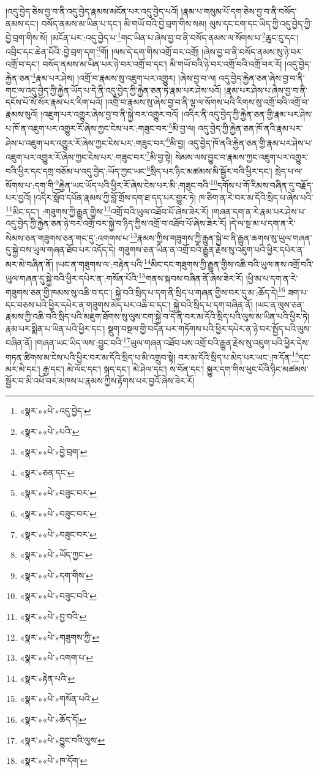 །འདུ་བྱེད་ཅེས་བྱ་བ་ནི་འདུ་བྱེད་རྣམས་མངོན་པར་འདུ་བྱེད་པའོ། །རྣམ་པ་གསུམ་པོ་དག་ཅེས་བྱ་བ་ནི་བསོད་ནམས་དང་། བསོད་ནམས་མ་ཡིན་པ་དང་། མི་གཡོ་བའི་བྱེ་བྲག་གིས་སམ། ལུས་དང་ངག་དང་ཡིད་ཀྱི་འདུ་བྱེད་ཀྱི་བྱེ་བྲག་གིས་སོ། །མངོན་པར་:འདུ་བྱེད་པ་\footnote{«སྣར་»«པེ་»འདུ་བྱེད་}གང་ཡིན་པ་ཞེས་བྱ་བ་ནི་བསོད་ནམས་ལ་སོགས་པ་\footnote{«སྣར་»«པེ་»པའི་}ཆུང་ངུ་དང་། འབྲིང་དང་ཆེན་པོའི་:བྱེ་བྲག་དག་\footnote{«སྣར་»«པེ་»བྱེ་བྲག་}གོ། །ལས་དེ་དག་གིས་འགྲོ་བར་འགྲོ། །ཞེས་བྱ་བ་ནི་བསོད་ནམས་སུ་ཉེ་བར་འགྲོ་བ་དང་། བསོད་ནམས་མ་ཡིན་པར་ཉེ་བར་འགྲོ་བ་དང་། མི་གཡོ་བའི་ཉེ་བར་འགྲོ་བའི་འགྲོ་བར་རོ། །འདུ་བྱེད་རྐྱེན་ཅན་\footnote{«སྣར་»ཅན་དང་}རྣམ་པར་ཤེས། །འགྲོ་བ་རྣམས་སུ་འཇུག་པར་འགྱུར། །ཞེས་བྱ་བ་ལ། འདུ་བྱེད་རྐྱེན་ཅན་ཞེས་བྱ་བ་ནི་གང་ལ་འདུ་བྱེད་ཀྱི་རྐྱེན་ཡོད་པ་དེ་ནི་འདུ་བྱེད་ཀྱི་རྐྱེན་ཅན་ཏེ་རྣམ་པར་ཤེས་པའོ། །རྣམ་པར་ཤེས་པ་ཞེས་བྱ་བ་ནི་དངོས་པོ་སོ་སོར་རྣམ་པར་རིག་པའོ། །འགྲོ་བ་རྣམས་སུ་ཞེས་བྱ་བ་ནི་ལྷ་ལ་སོགས་པའི་རིགས་སུ་འགྲོ་བའི་འགྲོ་བ་རྣམས་སུའོ། །འཇུག་པར་འགྱུར་ཞེས་བྱ་བ་ནི་སྐྱེ་བར་འགྱུར་བའོ། །འདིར་ནི་འདུ་བྱེད་ཀྱི་རྐྱེན་ཅན་གྱི་རྣམ་པར་ཤེས་པ་ཁོ་ན་འཇུག་པར་འགྱུར་རོ་ཞེས་ཀྱང་ངེས་པར་:གཟུང་བར་\footnote{«སྣར་»«པེ་»བཟུང་བར་}མི་བྱ་ལ། འདུ་བྱེད་ཀྱི་རྐྱེན་ཅན་ཁོ་ནའི་རྣམ་པར་ཤེས་པ་འཇུག་པར་འགྱུར་རོ་ཞེས་ཀྱང་ངེས་པར་:གཟུང་བར་\footnote{«སྣར་»«པེ་»བཟུང་བར་}མི་བྱ། འདུ་བྱེད་ཁོ་ནའི་རྐྱེན་ཅན་གྱི་རྣམ་པར་ཤེས་པ་འཇུག་པར་འགྱུར་རོ་ཞེས་ཀྱང་ངེས་པར་:གཟུང་བར་\footnote{«སྣར་»«པེ་»བཟུང་བར་}མི་བྱ་སྟེ། སེམས་ལས་བྱུང་བ་རྣམས་ཀྱང་འཇུག་པར་འགྱུར་བའི་ཕྱིར་དང་དགྲ་བཅོམ་པ་འདུ་བྱེད་:ཡོད་ཀྱང་ཡང་\footnote{«སྣར་»«པེ་»ཡོད་ཀྱང་}སྲིད་པར་ཉིང་མཚམས་མི་སྦྱོར་བའི་ཕྱིར་དང་། སྲེད་པ་ལ་སོགས་པ་:དག་གི་\footnote{«སྣར་»«པེ་»དག་གིས་}རྐྱེན་ཡང་ཡོད་པའི་ཕྱིར་རོ་ཞེས་ངེས་པར་མི་:གཟུང་བའི་\footnote{«སྣར་»«པེ་»བཟུང་བའི་}དགོས་པ་གོ་རིམས་བཞིན་དུ་བརྗོད་པར་བྱའོ། །འདིར་སློབ་དཔོན་རྣམས་ཀྱི་བློ་གྲོས་དག་ཐ་དད་པར་གྱུར་ཏེ། ཁ་ཅིག་ན་རེ་བར་མ་དོའི་སྲིད་པ་ཞེས་པའི་\footnote{«སྣར་»«པེ་»བྱ་བའི་}མིང་དང་། :གཟུགས་ཀྱི་རྒྱུན་གྱིས་\footnote{«སྣར་»«པེ་»གཟུགས་ཀྱི་}འགྲོ་བའི་ཡུལ་འཐོབ་པོ་ཞེས་ཟེར་རོ། །གཞན་དག་ན་རེ་རྣམ་པར་ཤེས་པ་འདུ་བྱེད་ཀྱི་རྐྱེན་ཅན་ཉེ་བར་འགྲོ་བར་སྐྱེ་བ་ཉིད་ཀྱིས་འགྲོ་བ་འཐོབ་པོ་ཞེས་ཟེར་རོ། །དེ་ལ་སྔ་མ་པ་དག་ན་རེ་སེམས་ཅན་གཟུགས་ཅན་གང་དུ་:འགགས་པ་\footnote{«སྣར་»«པེ་»འགག་པ་}རྣམས་ཀྱིས་གཟུགས་ཀྱི་རྒྱུན་སྐྱེ་བ་ནི་རྒྱུན་ཆགས་སུ་ཡུལ་གཞན་དུ་སྐྱེ་བས་ཡུལ་གཞན་ཐོབ་པར་འདོད་དེ། གཟུགས་ཅན་ཡིན་ན་འགྲོ་བའི་རྒྱུན་རྗེས་སུ་འཇུག་པའི་ཕྱིར་དཔེར་ན་མར་མེ་བཞིན་ནོ། །ཡང་ན་གཟུགས་ལ་:བརྟེན་པའི་\footnote{«སྣར་»རྟེན་པའི་}མིང་དང་གཟུགས་ཀྱི་རྒྱུན་གྱིས་འཆི་བའི་ཡུལ་ནས་འགྲོ་བའི་ཡུལ་གཞན་དུ་སྐྱེ་བའི་ཕྱིར་དཔེར་ན་:གསོན་པོའི་\footnote{«སྣར་»«པེ་»གསོན་པའི་}གནས་སྐབས་བཞིན་ནོ་ཞེས་ཟེར་རོ། །ཕྱི་མ་པ་དག་ན་རེ་གཟུགས་ཅན་གྱི་ཁམས་སུ་འཆི་བ་དང་། སྐྱེ་བའི་སྲིད་པ་དག་ནི་སྲིད་པ་གཞན་གྱིས་བར་དུ་མ་:ཆོད་དེ།\footnote{«སྣར་»«པེ་»ཆོད་དོ།} ཟག་པ་དང་བཅས་པའི་ཕྱིར་དཔེར་ན་གཟུགས་མེད་པར་འཆི་བ་དང་། སྐྱེ་བའི་སྲིད་པ་དག་བཞིན་ནོ། །ཡང་ན་ལུས་ཅན་རྣམས་ཀྱི་འཆི་བའི་སྲིད་པའི་མཇུག་ཐོགས་སུ་ལུས་ངག་སྐྱེ་བ་དེ་ནི་བར་མ་དོའི་སྲིད་པའི་ལུས་མ་ཡིན་པའི་ཕྱིར་ཏེ། རྣམ་པར་སྨིན་པ་ཡིན་པའི་ཕྱིར་དང་། སྡུག་བསྔལ་གྱི་བདེན་པར་གཏོགས་པའི་ཕྱིར་དཔེར་ན་ཉེ་བར་སྤྱོད་པའི་ལུས་བཞིན་ནོ། །གཞན་ཡང་ཡིད་ལས་:བྱུང་བའི་\footnote{«སྣར་»«པེ་»བྱུང་བའི་ལུས་}ཡུལ་གཞན་འཐོབ་པས་འགྲོ་བའི་རྒྱུན་རྗེས་སུ་འཇུག་པའི་ཕྱིར་དེས་གཏན་ཚིགས་མ་ངེས་པའི་ཕྱིར་བར་མ་དོའི་སྲིད་པ་མི་འགྲུབ་སྟེ། བར་མ་དོའི་སྲིད་པ་མེད་པར་ཡང་:ཁ་དོན་\footnote{«སྣར་»«པེ་»ཁ་དོག་}དང་མར་མེ་དང་། རྒྱ་དང་། མེ་ལོང་དང་། སྐད་དང་། མེ་ཤེལ་དང་། ས་བོན་དང་། སྐྱུར་དག་གིས་ཕུང་པོའི་ཉིང་མཚམས་སྦྱོར་བ་མི་འཕོ་བར་མཁས་པ་རྣམས་ཀྱིས་རྟོགས་པར་བྱའོ་ཞེས་ཟེར་རོ། 